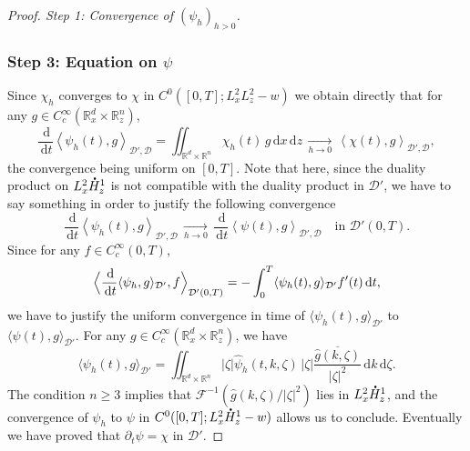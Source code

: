 \documentclass[10pt]{amsart}
\let\hat\oldhat
\theoremstyle{definition}
\newcommand*{\overbigdot}[1]{%
\accentset{\mbox{\large\bfseries .}}{#1}}
\let\hat\widehat
\newcommand{\R}{\mathbb{R}}
\newcommand{\ud}{\, {\mathrm{d}}}
\begin{document}
\begin{proof}[Proof. Step 1: Convergence of $(\psi_{h})_{h>0}$]
\subsubsection*{Step 3: Equation on $\psi$} Since $\chi_{h}$ converges to $\chi$ in $C^{0}([0,T];L_{x}^{2}L_{z}^{2}-w)$ we obtain directly that for any $g\in C_{c}^{\infty}(\R_{x}^{d}\times\R_{z}^{n})$,
\[
\frac{\ud}{\ud t}\left\langle\psi_{h}(t),g\right\rangle_{\mathcal{D}',\mathcal{D}}=\iint_{\R^{d}\times\R^{n}}\chi_{h}(t)\,g\ud x\ud z\,\underset{h\to 0}{\to}\,\left\langle\chi(t),g\right\rangle_{\mathcal{D}',\mathcal{D}},
\]
the convergence being uniform on $[0,T]$. Note that here, since the duality product on $L_{x}^{2}\overbigdot{H}_{z}^{1}$ is not compatible with the duality product in $\mathcal{D}'$, we have to say something in order to justify the following convergence
\[
\frac{\ud}{\ud t}\left\langle\psi_{h}(t),g\right\rangle_{\mathcal{D}',\mathcal{D}}\,\underset{h\to 0}{\to}\,\frac{\ud}{\ud t}\left\langle\psi(t),g\right\rangle_{\mathcal{D}',\mathcal{D}}\quad\text{in }\mathcal{D}'(0,T).
\]
Since for any $f\in C_{c}^{\infty}(0,T)$,\vspace*{-3pt}
\[
\Bigl\langle\frac{\ud}{\ud t}\langle\psi_{h},g\rangle_{\mathcal{D}'},f\Bigr\rangle_{\mathcal{D'}(0,T)}=-\int_{0}^{T}\langle\psi_{h}(t),g\rangle_{\mathcal{D}'}f'(t)\ud t,
\]
we have to justify the uniform convergence in time of $\langle\psi_{h}(t),g\rangle_{\mathcal{D}'}$ to $\langle\psi(t),g\rangle_{\mathcal{D}'}$. For any $g\in C_{c}^{\infty}(\R_{x}^{d}\times\R_{z}^{n})$, we have
\[
\langle\psi_{h}(t),g\rangle_{\mathcal{D}'}=\iint_{\R^{d}\times\R^{n}}|\zeta|\hat{\psi}_{h}(t,k,\zeta)\,|\zeta|\overline{\frac{\hat{g}(k,\zeta)}{|\zeta|^{2}}}\ud k\ud\zeta.
\]
The condition $n\geq 3$ implies that $\mathcal{F}^{-1}(\hat{g}(k,\zeta)/|\zeta|^{2})$ lies in $L_{x}^{2}\overbigdot{H}_{z}^{1}$, and the convergence of $\psi_{h}$ to $\psi$ in $C^{0}([0,T];L_{x}^{2}\overbigdot{H}_{z}^{1}-w)$ allows us to conclude. Eventually we have proved that $\partial_{t}\psi=\chi$ in $\mathcal{D}'$.


\end{proof}
\end{document}
